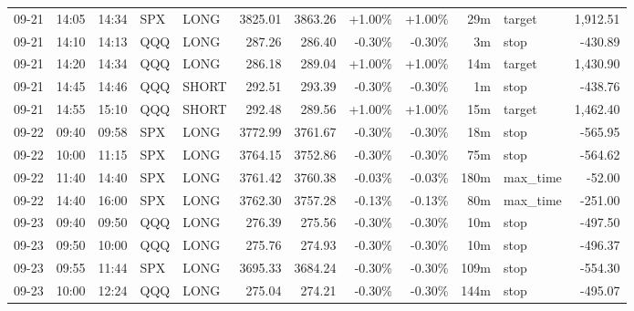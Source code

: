 \documentclass[11pt,a4paper,twoside]{article}
\begin{document}
\begin{center}
\begin{longtable}{>{\color{txtmain}}l l l l l r r r r r >{\color{txtmain}}l r}
09-21 & 14:05 & 14:34 & SPX & LONG & 3825.01 & 3863.26 & \textcolor{wingreen}{+1.00\%} & \textcolor{wingreen}{+1.00\%} & 29m & target & \textcolor{wingreen}{1,912.51} \\
09-21 & 14:10 & 14:13 & QQQ & LONG & 287.26 & 286.40 & \textcolor{lossred}{-0.30\%} & \textcolor{lossred}{-0.30\%} & 3m & stop & \textcolor{lossred}{-430.89} \\
09-21 & 14:20 & 14:34 & QQQ & LONG & 286.18 & 289.04 & \textcolor{wingreen}{+1.00\%} & \textcolor{wingreen}{+1.00\%} & 14m & target & \textcolor{wingreen}{1,430.90} \\
09-21 & 14:45 & 14:46 & QQQ & SHORT & 292.51 & 293.39 & \textcolor{lossred}{-0.30\%} & \textcolor{lossred}{-0.30\%} & 1m & stop & \textcolor{lossred}{-438.76} \\
09-21 & 14:55 & 15:10 & QQQ & SHORT & 292.48 & 289.56 & \textcolor{wingreen}{+1.00\%} & \textcolor{wingreen}{+1.00\%} & 15m & target & \textcolor{wingreen}{1,462.40} \\
09-22 & 09:40 & 09:58 & SPX & LONG & 3772.99 & 3761.67 & \textcolor{lossred}{-0.30\%} & \textcolor{lossred}{-0.30\%} & 18m & stop & \textcolor{lossred}{-565.95} \\
09-22 & 10:00 & 11:15 & SPX & LONG & 3764.15 & 3752.86 & \textcolor{lossred}{-0.30\%} & \textcolor{lossred}{-0.30\%} & 75m & stop & \textcolor{lossred}{-564.62} \\
09-22 & 11:40 & 14:40 & SPX & LONG & 3761.42 & 3760.38 & \textcolor{lossred}{-0.03\%} & \textcolor{lossred}{-0.03\%} & 180m & max\_time & \textcolor{lossred}{-52.00} \\
09-22 & 14:40 & 16:00 & SPX & LONG & 3762.30 & 3757.28 & \textcolor{lossred}{-0.13\%} & \textcolor{lossred}{-0.13\%} & 80m & max\_time & \textcolor{lossred}{-251.00} \\
09-23 & 09:40 & 09:50 & QQQ & LONG & 276.39 & 275.56 & \textcolor{lossred}{-0.30\%} & \textcolor{lossred}{-0.30\%} & 10m & stop & \textcolor{lossred}{-497.50} \\
09-23 & 09:50 & 10:00 & QQQ & LONG & 275.76 & 274.93 & \textcolor{lossred}{-0.30\%} & \textcolor{lossred}{-0.30\%} & 10m & stop & \textcolor{lossred}{-496.37} \\
09-23 & 09:55 & 11:44 & SPX & LONG & 3695.33 & 3684.24 & \textcolor{lossred}{-0.30\%} & \textcolor{lossred}{-0.30\%} & 109m & stop & \textcolor{lossred}{-554.30} \\
09-23 & 10:00 & 12:24 & QQQ & LONG & 275.04 & 274.21 & \textcolor{lossred}{-0.30\%} & \textcolor{lossred}{-0.30\%} & 144m & stop & \textcolor{lossred}{-495.07} \\

\end{longtable}
\end{center}
\end{document}
